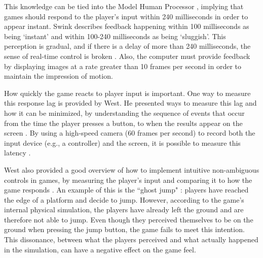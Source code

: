 This knowledge can be tied into the Model Human Processor \cite{card1986model, swink}, implying that games should respond to the player's input within 240 milliseconds in order to appear instant. Swink describes feedback happening within 100 milliseconds as being `instant' and within 100-240 milliseconds as being `sluggish'. This perception is gradual, and if there is a delay of more than 240 milliseconds, the sense of real-time control is broken \cite{swink}. Also, the computer must provide feedback by displaying images at a rate greater than 10 frames per second in order to maintain the impression of motion.

How quickly the game reacts to player input is important. One way to measure this response lag is provided by West. He presented ways to measure this lag and how it can be minimized, by understanding the sequence of events that occur from the time the player presses a button, to when the results appear on the screen \cite{measure_lag, program_lag}. By using a high-speed camera (60 frames per second) to record both the input device (e.g., a controller) and the screen, it is possible to measure this latency \cite{euro}.


West also provided a good overview of how to implement intuitive non-ambiguous controls in games, by measuring the player's input and comparing it to how the game responds \cite{intuitive_buttons}. An example of this is the ``ghost jump" \cite{ghostJump, canabalt}: players have reached the edge of a platform and decide to jump. However, according to the game's internal physical simulation, the players have already left the ground and are therefore not able to jump. Even though they perceived themselves to be on the ground when pressing the jump button, the game fails to meet this intention. This dissonance, between what the players perceived and what actually happened in the simulation, can have a negative effect on the game feel.


